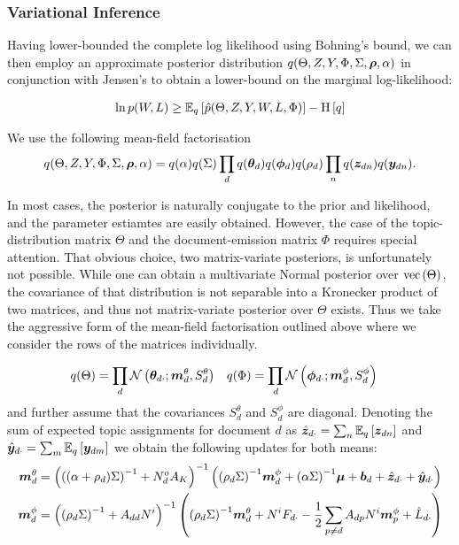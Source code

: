 \subsubsection*{Variational Inference}
Having lower-bounded the complete log likelihood using Bohning's bound, we can then employ an approximate posterior distribution $q(\Theta, Z, Y, \Phi, \Sigma, \vv{\rho}, \alpha)$ in conjunction with Jensen's to obtain a lower-bound on the marginal log-likelihood:

\begin{align}
\ln p(W, L) \geq \ex{\hat{p}(\Theta, Z, Y, W, L, \Phi)}{q} - \ent{q}
\end{align}

We use the following mean-field factorisation
\begin{align}
q(\Theta, Z, Y, \Phi, \Sigma, \vv{\rho}, \alpha) = q(\alpha)q(\Sigma)\prod_d q(\thd)q(\vv{\phi}_d)q(\rho_d)\prod_n q(\vv{z}_{dn})q(\vv{y}_{dn}).
\end{align}

In most cases, the posterior is naturally conjugate to the prior and likelihood, and the parameter estiamtes are easily obtained. However, the case of the topic-distribution matrix $\Theta$ and the document-emission matrix $\Phi$ requires special attention. That obvious choice, two matrix-variate posteriors, is unfortunately not possible. While one can obtain a multivariate Normal posterior over $\vecf{\Theta}$, the covariance of that distribution is not separable into a Kronecker product of two matrices, and thus not matrix-variate posterior over $\Theta$ exists. Thus we take the aggressive form of the mean-field factorisation outlined above where we consider the rows of the matrices individually.

\newcommand \mtd { { \vv{m}^{\theta}_d } }
\newcommand \std { { S^\theta_d } }
\newcommand \mpd { { \vv{m}^{\phi}_d } }
\newcommand \spd { { S^\phi_d } }

\begin{align}
q(\Theta) &= \prod_d \mathcal{N}\left(\thdo; \mtd, \std \right) &
q(\Phi) &= \prod_d \mathcal{N}\left(\phdo; \mpd, \spd\right) 
\end{align}
and further assume that the covariances $\std$ and $\spd$ are diagonal. Denoting the sum of expected topic assignments for document $d$ as $\hat{\vv{z}}_{d\cdot} = \sum_n \ex{\vv{z}_{dn}}{q}$ and $\hat{\vv{y}}_{d\cdot} = \sum_m \ex{\vv{y}_{dm}}{q}$ we obtain the following updates for both means:
\begin{align}
\mtd &= \invb{ \invb{(\alpha + \rho_d)\Sigma} + N^o_d A_K }
            \left(
                \invb{\rho_d \Sigma} \mpd
                + \invb{\alpha \Sigma}\vv{\mu}
                + \vv{b}_d 
                + \hat{\vv{z}}_{d\cdot}
                + \hat{\vv{y}}_{d\cdot}
            \right) \\
 \mpd & = \invb{\invb{\rho_d \Sigma} + A_{dd}N^i}
             \left(
                 \invb{\rho_d \Sigma}\mtd + N^i F_{d\cdot} -\half \sum_{p \neq d} A_{dp} N^i \vv{m}^\phi_p + \hat{L}_{d\cdot}
             \right)
 \end{align}
 
